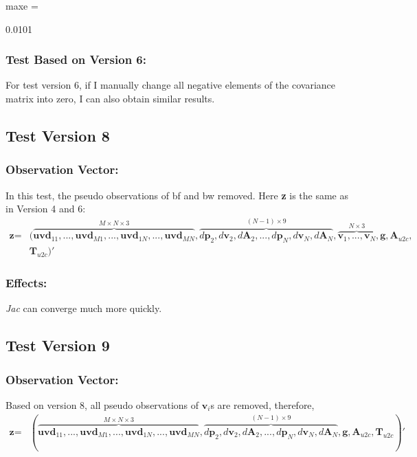 \documentclass[12pt]{article}   %
\begin{document}
maxe =

    0.0101
	
\subsubsection{Test Based on Version 6:}

For test version 6, if I manually change all negative elements of the covariance matrix into zero, I can also obtain similar results.

\subsection{Test Version 8}
\subsubsection{Observation Vector:}

In this test, the pseudo observations of bf and bw removed. Here \textbf{z} is the same as in Version 4 and 6:
\begin{align*}
\textbf{z}=&(\overbrace{\textbf{uvd}_{11}, ... , \textbf{uvd}_{M1}, ..., \textbf{uvd}_{1N}, ... , \textbf{uvd}_{MN}}^{M \times N \times 3}, \overbrace{d\textbf{p}_2, d\textbf{v}_2, d\textbf{A}_2, ..., d\textbf{p}_N, d\textbf{v}_N, d\textbf{A}_N}^{(N-1) \times 9}, \overbrace{\textbf{v}_1, ..., \textbf{v}_{N}}^{N \times 3},  \textbf{g}, \textbf{A}_{u2c}, \\
 &\textbf{T}_{u2c})' 
\end{align*}

\subsubsection{Effects:}	

\textit{Jac} can converge much more quickly.

\subsection{Test Version 9}
\subsubsection{Observation Vector:}

Based on version 8, all pseudo observations of $\textbf{v}_i$s are removed, therefore, 
\begin{align*}
\textbf{z}=&(\overbrace{\textbf{uvd}_{11}, ... , \textbf{uvd}_{M1}, ..., \textbf{uvd}_{1N}, ... , \textbf{uvd}_{MN}}^{M \times N \times 3}, \overbrace{d\textbf{p}_2, d\textbf{v}_2, d\textbf{A}_2, ..., d\textbf{p}_N, d\textbf{v}_N, d\textbf{A}_N}^{(N-1) \times 9}, \textbf{g}, \textbf{A}_{u2c}, \textbf{T}_{u2c})'
\end{align*}
\end{document}
